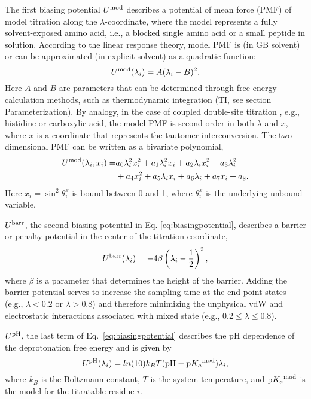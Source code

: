 The first biasing potential $U^{\rm mod}$ describes a potential of mean force (PMF) of model titration along the $\lambda$-coordinate, where the model represents a fully solvent-exposed amino acid, i.e., a blocked single amino acid or a small peptide in solution.
According to the linear response theory, 
model PMF is (in GB solvent) or can be approximated (in explicit solvent) as a quadratic function:
\begin{equation}
\label{eq:Umod_1d}
U^{\rm mod}(\lambda_i)=A(\lambda_i-B)^2.
\end{equation}
Here $A$ and $B$ are parameters that can be determined through free energy calculation methods, such as thermodynamic integration (TI, see section Parameterization). 
By analogy, in the case of coupled double-site titration \cite{Khandogin_Brooks_2005_Biophys.J.}, e.g., histidine or carboxylic acid, the model PMF is second order in both $\lambda$ and $x$, where 
$x$ is a coordinate that represents the tautomer interconversion.
The two-dimensional PMF can be written as a bivariate polynomial,
%
\begin{equation}
\begin{split}
U^{\rm mod}(\lambda_i,x_i) =
&a_0 \lambda_i^2 x_i^2 + a_1 \lambda_i^2 x_i + a_2 \lambda_i x_i^2 + a_3 \lambda_i^2 \\
&+ a_4 x_i^2 + a_5 \lambda_i x_i + a_6 \lambda_i + a_7 x_i + a_8.
\end{split}
\label{eq:double}
\end{equation}
Here $x_{i}=\sin^{2}\theta^{x}_{i}$ is bound between 0 and 1, where $\theta^{x}_{i}$ is the underlying unbound
variable. 
%

$U^{\rm barr}$, the second biasing potential in Eq. \ref{eq:biasingpotential}, describes a barrier or penalty potential in the center of the titration coordinate, 
%
\begin{equation}
U^{\rm barr}(\lambda_i) = -4\beta\left(\lambda_i - \frac{1}{2} \right)^2,
\label{eq:Ubarr}
\end{equation}
where $\beta$ is a parameter that determines the height of the barrier. 
Adding the barrier potential serves to
increase the sampling time at the end-point states (e.g., $\lambda<0.2$ or $\lambda>0.8$) and therefore
minimizing the unphysical vdW and electrostatic interactions associated with mixed state 
(e.g., $0.2 \le \lambda \le 0.8$). 

$U^{\rm pH}$, the last term of Eq.~\ref{eq:biasingpotential} 
describes the pH dependence of the deprotonation free energy 
and is given by
%
\begin{equation}
U^{\rm pH}(\lambda_i)=ln(10)k_BT({\rm pH}-\textrm{p}{K_a}^{\rm mod})\lambda_i, 
\label{eq:UpH}
\end{equation}
% 
where $k_B$ is the Boltzmann constant, $T$ is the system temperature, and $\textrm{p}{K_a}^{\rm mod}$ is the model {\pka} for the titratable residue $i$.

